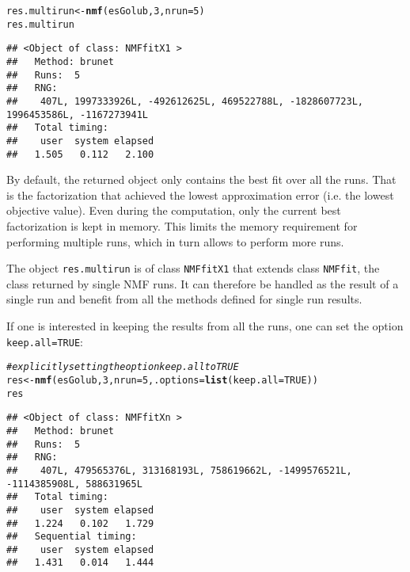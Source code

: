 \documentclass[a4paper]{article}\usepackage[]{graphicx}\usepackage[]{color}
\makeatletter
\newcommand{\hlnum}[1]{\textcolor[rgb]{0.686,0.059,0.569}{#1}}%
\newcommand{\hlcom}[1]{\textcolor[rgb]{0.678,0.584,0.686}{\textit{#1}}}%
\newcommand{\hlstd}[1]{\textcolor[rgb]{0.345,0.345,0.345}{#1}}%
\newcommand{\hlkwb}[1]{\textcolor[rgb]{0.69,0.353,0.396}{#1}}%
\newcommand{\hlkwc}[1]{\textcolor[rgb]{0.333,0.667,0.333}{#1}}%
\newcommand{\hlkwd}[1]{\textcolor[rgb]{0.737,0.353,0.396}{\textbf{#1}}}%
\newenvironment{kframe}{%
 \def\at@end@of@kframe{}%
 \ifinner\ifhmode%
  \def\at@end@of@kframe{\end{minipage}}%
  \begin{minipage}{\columnwidth}%
 \fi\fi%
 \def\FrameCommand##1{\hskip\@totalleftmargin \hskip-\fboxsep
 \colorbox{shadecolor}{##1}\hskip-\fboxsep
     \hskip-\linewidth \hskip-\@totalleftmargin \hskip\columnwidth}%
 \MakeFramed {\advance\hsize-\width
   \@totalleftmargin\z@ \linewidth\hsize
   \@setminipage}}%
 {\par\unskip\endMakeFramed%
 \at@end@of@kframe}
\newenvironment{knitrout}{}{} %
\let\code=\texttt
\makeatother
\begin{document}
\begin{knitrout}
\color{fgcolor}\begin{kframe}
\begin{alltt}
\hlstd{res.multirun} \hlkwb{<-} \hlkwd{nmf}\hlstd{(esGolub,} \hlnum{3}\hlstd{,} \hlkwc{nrun}\hlstd{=}\hlnum{5}\hlstd{)}
\hlstd{res.multirun}
\end{alltt}
\begin{verbatim}
## <Object of class: NMFfitX1 >
##   Method: brunet 
##   Runs:  5 
##   RNG:
##    407L, 1997333926L, -492612625L, 469522788L, -1828607723L, 1996453586L, -1167273941L 
##   Total timing:
##    user  system elapsed 
##   1.505   0.112   2.100
\end{verbatim}
\end{kframe}
\end{knitrout}

By default, the returned object only contains the best fit over all the runs.
That is the factorization that achieved the lowest approximation error (i.e. the lowest objective value).
Even during the computation, only the current best factorization is kept in memory.
This limits the memory requirement for performing multiple runs, which in turn allows to perform more runs.

The object \code{res.multirun} is of class \code{NMFfitX1} that extends class \code{NMFfit}, the class returned by single NMF runs. 
It can therefore be handled as the result of a single run and benefit from all the methods defined for single run results.

\medskip
If one is interested in keeping the results from all the runs, one can set the option \code{keep.all=TRUE}:

\begin{knitrout}
\color{fgcolor}\begin{kframe}
\begin{alltt}
\hlcom{# explicitly setting the option keep.all to TRUE}
\hlstd{res} \hlkwb{<-} \hlkwd{nmf}\hlstd{(esGolub,} \hlnum{3}\hlstd{,} \hlkwc{nrun}\hlstd{=}\hlnum{5}\hlstd{,} \hlkwc{.options}\hlstd{=}\hlkwd{list}\hlstd{(}\hlkwc{keep.all}\hlstd{=}\hlnum{TRUE}\hlstd{))}
\hlstd{res}
\end{alltt}
\begin{verbatim}
## <Object of class: NMFfitXn >
##   Method: brunet 
##   Runs:  5 
##   RNG:
##    407L, 479565376L, 313168193L, 758619662L, -1499576521L, -1114385908L, 588631965L 
##   Total timing:
##    user  system elapsed 
##   1.224   0.102   1.729 
##   Sequential timing:
##    user  system elapsed 
##   1.431   0.014   1.444
\end{verbatim}
\end{kframe}
\end{knitrout}
\end{document}

